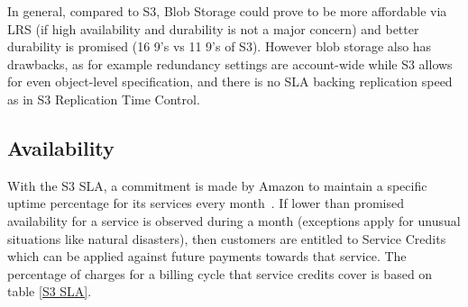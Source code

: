 In general, compared to S3, Blob Storage could prove to be more affordable via LRS (if high availability and durability is not a major concern) and better durability is promised (16 9's vs 11 9's of S3). However blob storage also has drawbacks, as for example redundancy settings are account-wide while S3 allows for even object-level specification, and there is no SLA backing replication speed as in S3 Replication Time Control.

\subsection{Availability}
With the S3 SLA, a commitment is made by Amazon to maintain a specific uptime percentage for its services every month~\cite{s3sla}. If lower than promised availability for a service is observed during a month (exceptions apply for unusual situations like natural disasters), then customers are entitled to Service Credits which can be applied against future payments towards that service. The percentage of charges for a billing cycle that service credits cover is based on table \ref{S3 SLA}.

\begin{table}[h]
    \caption{\label{S3 SLA}S3 Availability SLA}
\end{table}

